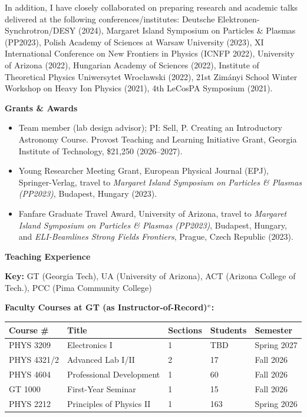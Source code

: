 \documentclass[11pt]{article}
\begin{document}
\noindent In addition, I have closely collaborated on preparing research and academic talks delivered at the following conferences/institutes: Deutsche Elektronen-Synchrotron/DESY (2024), Margaret Island Symposium on Particles \& Plasmas (PP2023), Polish Academy of Sciences at Warsaw University (2023), XI International Conference on New Frontiers in Physics (ICNFP 2022), University of Arizona (2022), Hungarian Academy of Sciences (2022), Institute of Theoretical Physics Uniwersytet Wroc\l{}awski (2022), 21st Zim\'{a}nyi School Winter Workshop on Heavy Ion Physics (2021), 4th LeCosPA Symposium (2021).

\medskip

{\Large\textbf{Grants \& Awards}}

\begin{itemize}[leftmargin=*,nosep]
    \item Team member (lab design advisor); PI: Sell, P. Creating an Introductory Astronomy Course. Provost Teaching and Learning Initiative Grant, Georgia Institute of Technology, \$21,250 (2026--2027).
    \item Young Researcher Meeting Grant, European Physical Journal (EPJ), Springer-Verlag, travel to \textit{Margaret Island Symposium on Particles \& Plasmas (PP2023)}, Budapest, Hungary (2023).
    \item Fanfare Graduate Travel Award, University of Arizona, travel to \textit{Margaret Island Symposium on Particles \& Plasmas (PP2023)}, Budapest, Hungary, and \textit{ELI-Beamlines Strong Fields Frontiers}, Prague, Czech Republic (2023).
\end{itemize}

\medskip

{\Large\textbf{Teaching Experience}}

\textbf{Key:} GT (Georgia Tech), UA (University of Arizona), ACT (Arizona College of Tech.), PCC (Pima Community College)


\textbf{Faculty Courses at GT (as Instructor-of-Record)\(^{\rm e}\):}\\
{\normalsize
\begin{tabular}{@{}p{2.5cm} p{6.0cm} p{2.0cm} p{2.0cm} p{3.0cm}@{}}
    \toprule
    \textbf{Course \#} & \textbf{Title} & \textbf{Sections} & \textbf{Students} & \textbf{Semester} \\
    \midrule
    PHYS 3209 & Electronics I & 1 & TBD & Spring 2027 \\
    PHYS 4321/2 & Advanced Lab I/II & 2 & 17 & Fall 2026 \\
    PHYS 4604 & Professional Development & 1 & 60 & Fall 2026 \\
    GT 1000 & First-Year Seminar & 1 & 15 & Fall 2026 \\
    PHYS 2212 & Principles of Physics II & 1 & 163 & Spring 2026 \\
    \bottomrule
\end{tabular}
}
\end{document}
